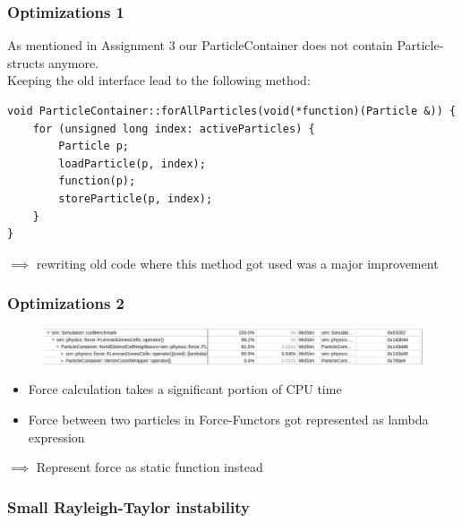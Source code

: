 \begin{frame}[fragile]
	\frametitle{Optimizations 1}
	\large
As mentioned in Assignment 3 our ParticleContainer does not contain Particle-structs anymore.\\
Keeping the old interface lead to the following method:
\begin{lstlisting}
void ParticleContainer::forAllParticles(void(*function)(Particle &)) {
	for (unsigned long index: activeParticles) {
		Particle p;
		loadParticle(p, index);
		function(p);
		storeParticle(p, index);
	}
}
\end{lstlisting}

$\implies$ rewriting old code where this method got used was a major improvement

\end{frame}

\begin{frame}
	\frametitle{Optimizations 2}
	\large
	
	\begin{figure}
		\centering
		\includegraphics[width=1\linewidth]{profile_preoptimization_just_relevant_part}
		\label{fig:profilepreoptimizationjustrelevantpart}
	\end{figure}
	
	\begin{itemize}
		\item Force calculation takes a significant portion of CPU time
		\item Force between two particles in Force-Functors got represented as lambda expression
	\end{itemize}
	
	$\implies$ Represent force as static function instead
	
\end{frame}

\begin{frame}
	\frametitle{Small Rayleigh-Taylor instability}
	
	\begin{figure}[h!]
		\centering    
	\end{figure} 
	
\end{frame}

